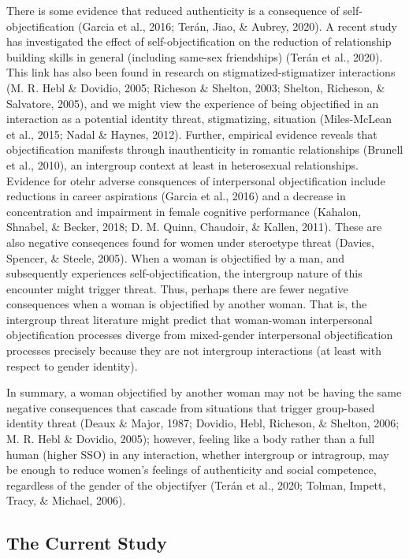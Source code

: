 \documentclass[man]{apa6}
\begin{document}
There is some evidence that reduced authenticity is a consequence of
self-objectification (Garcia et al., 2016; Terán, Jiao, \& Aubrey,
2020). A recent study has investigated the effect of
self-objectification on the reduction of relationship building skills in
general (including same-sex friendships) (Terán et al., 2020). This link
has also been found in research on stigmatized-stigmatizer interactions
(M. R. Hebl \& Dovidio, 2005; Richeson \& Shelton, 2003; Shelton,
Richeson, \& Salvatore, 2005), and we might view the experience of being
objectified in an interaction as a potential identity threat,
stigmatizing, situation (Miles-McLean et al., 2015; Nadal \& Haynes,
2012). Further, empirical evidence reveals that objectification
manifests through inauthenticity in romantic relationships (Brunell et
al., 2010), an intergroup context at least in heterosexual
relationships. Evidence for otehr adverse consquences of interpersonal
objectification include reductions in career aspirations (Garcia et al.,
2016) and a decrease in concentration and impairment in female cognitive
performance (Kahalon, Shnabel, \& Becker, 2018; D. M. Quinn, Chaudoir,
\& Kallen, 2011). These are also negative conseqences found for women
under steroetype threat (Davies, Spencer, \& Steele, 2005). When a woman
is objectified by a man, and subsequently experiences
self-objectification, the intergroup nature of this encounter might
trigger threat. Thus, perhaps there are fewer negative consequences when
a woman is objectified by another woman. That is, the intergroup threat
literature might predict that woman-woman interpersonal objectification
processes diverge from mixed-gender interpersonal objectification
processes precisely because they are not intergroup interactions (at
least with respect to gender identity).

In summary, a woman objectified by another woman may not be having the
same negative consequences that cascade from situations that trigger
group-based identity threat (Deaux \& Major, 1987; Dovidio, Hebl,
Richeson, \& Shelton, 2006; M. R. Hebl \& Dovidio, 2005); however,
feeling like a body rather than a full human (higher SSO) in any
interaction, whether intergroup or intragroup, may be enough to reduce
women's feelings of authenticity and social competence, regardless of
the gender of the objectifyer (Terán et al., 2020; Tolman, Impett,
Tracy, \& Michael, 2006).

\subsection{The Current Study}\label{the-current-study}
\end{document}
